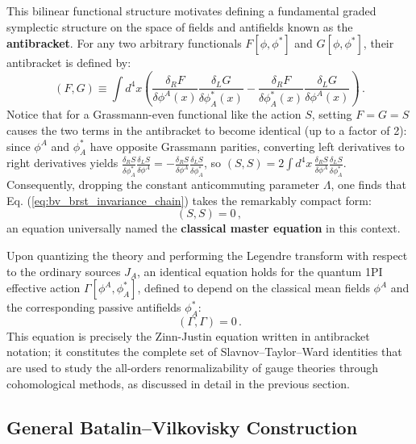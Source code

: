 This bilinear functional structure motivates defining a fundamental graded symplectic structure on the space of fields and antifields known as the \textbf{antibracket}. For any two arbitrary functionals \(F[\phi, \phi^*]\) and \(G[\phi, \phi^*]\), their antibracket is defined by:
\begin{equation} \label{eq:antibracket_definition}
    (F, G) \equiv \int d^4x \left( \frac{\delta_R F}{\delta \phi^A(x)} \frac{\delta_L G}{\delta \phi_A^*(x)} - \frac{\delta_R F}{\delta \phi_A^*(x)} \frac{\delta_L G}{\delta \phi^A(x)} \right) \, .
\end{equation}
Notice that for a Grassmann-even functional like the action \(S\), setting \(F = G = S\) causes the two terms in the antibracket to become identical (up to a factor of 2): since \(\phi^A\) and \(\phi_A^*\) have opposite Grassmann parities, converting left derivatives to right derivatives yields \(\frac{\delta_R S}{\delta \phi_A^*} \frac{\delta_L S}{\delta \phi^A} = - \frac{\delta_R S}{\delta \phi^A} \frac{\delta_L S}{\delta \phi_A^*}\), so \((S, S) = 2 \int d^4x \, \frac{\delta_R S}{\delta \phi^A} \frac{\delta_L S}{\delta \phi_A^*}\). Consequently, dropping the constant anticommuting parameter \(\Lambda\), one finds that Eq. (\ref{eq:bv_brst_invariance_chain}) takes the remarkably compact form:
\begin{equation} \label{eq:classical_master_equation}
    \boxed{(S, S) = 0} \, ,
\end{equation}
an equation universally named the \textbf{classical master equation} in this context.

Upon quantizing the theory and performing the Legendre transform with respect to the ordinary sources \(J_A\), an identical equation holds for the quantum 1PI effective action \(\Gamma[\phi^A, \phi_A^*]\), defined to depend on the classical mean fields \(\phi^A\) and the corresponding passive antifields \(\phi_A^*\):
\begin{equation} \label{eq:quantum_bv_master_equation}
    \boxed{(\Gamma, \Gamma) = 0} \, .
\end{equation}
This equation is precisely the Zinn-Justin equation written in antibracket notation; it constitutes the complete set of Slavnov--Taylor--Ward identities that are used to study the all-orders renormalizability of gauge theories through cohomological methods, as discussed in detail in the previous section.

\subsection{General Batalin--Vilkovisky Construction}

